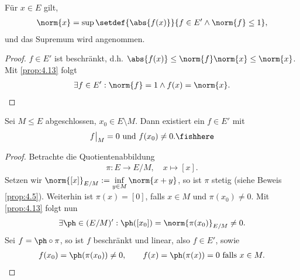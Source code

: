 \begin{cor}
\label{prop:4.15}
Für $x\in E$ gilt,
\begin{align*}
\norm{x} = \sup\setdef{\abs{f(x)}}{f\in E' \land \norm{f}\le 1},
\end{align*}
und das Supremum wird angenommen.\fishhere
\end{cor}
\begin{proof}
$f\in E'$ ist beschränkt, d.h.
$\abs{f(x)}\le \norm{f}\norm{x} \le \norm{x}$. Mit \ref{prop:4.13} folgt
\begin{align*}
\exists f\in E' : \norm{f} = 1 \land f(x) = \norm{x}.\qedhere
\end{align*}
\end{proof}

\begin{cor}
\label{prop:4.16}
Sei $M\le E$ abgeschlossen, $x_0\in E\setminus M$. Dann existiert ein $f\in E'$
mit
\begin{align*}
f\big|_M = 0 \text{ und } f(x_0)\neq 0.\fishhere 
\end{align*}
\end{cor}
\begin{proof}
Betrachte die Quotientenabbildung
\begin{align*}
\pi : E\to E/M,\quad x\mapsto [x].
\end{align*}
Setzen wir $\norm{[x]}_{E/M} := \inf\limits_{y\in M} \norm{x+y}$, so ist $\pi$
stetig (siehe Beweis \ref{prop:4.5}). Weiterhin ist $\pi(x) = [0]$, falls $x\in
M$ und $\pi(x_0)\neq 0$. Mit \ref{prop:4.13} folgt nun
\begin{align*}
\exists \ph\in (E/M)' : \ph([x_0]) = \norm{\pi(x_0)}_{E/M}\neq 0.
\end{align*}
Sei $f=\ph\circ\pi$, so ist $f$ beschränkt und linear, also $f\in E'$, sowie
\begin{align*}
f(x_0) = \ph(\pi(x_0)) \neq 0,\qquad
f(x) = \ph(\pi(x))=0\text{ falls } x\in M.\qedhere
\end{align*}
\end{proof}

